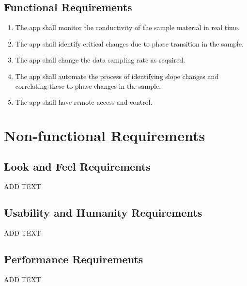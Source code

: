 \documentclass[12pt, titlepage]{article}
\begin{document}
\subsection{Functional Requirements}
\begin{enumerate}[{FR}1.] 
    \item
    The app shall monitor the conductivity of the sample material in real time. 
    \item
    The app shall identify critical changes due to phase transition in the sample.
    \item
    The app shall change the data sampling rate as required.
    \item
    The app shall automate the process of identifying slope changes and correlating these to phase changes in the sample. 
    \item
    The app shall have remote access and control. \\
	
\end{enumerate}

\section{Non-functional Requirements}


\subsection{Look and Feel Requirements}
\begin{adjustwidth}{2.2em}{0pt}
\begin{enumerate}[{NFR-L}1.]
   ADD TEXT
\end{enumerate}
\end{adjustwidth}
 

\subsection{Usability and Humanity Requirements}
\begin{adjustwidth}{2.2em}{0pt}
\begin{enumerate}[{NFR-U}1.]
    ADD TEXT
\end{enumerate}
\end{adjustwidth}

\subsection{Performance Requirements}
\begin{adjustwidth}{2.2em}{0pt}
\begin{enumerate}[{NFR-P}1.]
    ADD TEXT
\end{enumerate}
\end{adjustwidth}
\end{document}
